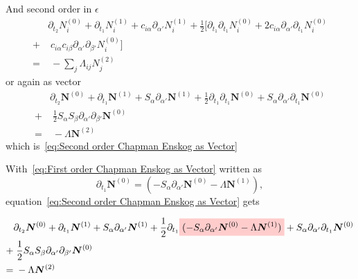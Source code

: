 \documentclass[]{article}
\newcommand{\highlight}[1]{%
  \colorbox{red!20}{$\displaystyle#1$}}
\begin{document}
\begin{appendices}
And second order in $\epsilon$
\begin{equation*}
	\begin{aligned}
		& \partial_{t_2} N_i^{(0)} + \partial_{t_1} N_i^{(1)} + c_{i\alpha}\partial_{\alpha'} N_i^{(1)} + \frac{1}{2} [\partial_{t_1}\partial_{t_1} N_i^{(0)} + 2 c_{i\alpha}\partial_{\alpha'}\partial_{t_1} N_i^{(0)} \\
		+ &\; c_{i\alpha}c_{i\beta}\partial_{\alpha'}\partial_{\beta'} N_i^{(0)}] \\
		= &\; - \sum_j \Lambda_{ij}  N_j^{(2)}
	\end{aligned}
\end{equation*}
or again as vector
\begin{equation*}
	\begin{aligned}
		& \partial_{t_2} \boldsymbol{N}^{(0)} + \partial_{t_1} \boldsymbol{N}^{(1)} + S_\alpha \partial_{\alpha'} \boldsymbol{N}^{(1)} + \frac{1}{2} \partial_{t_1}\partial_{t_1} \boldsymbol{N}^{(0)} +  S_\alpha
		 \partial_{\alpha'}\partial_{t_1} \boldsymbol{N}^{(0)} \\
		+ &\; \frac{1}{2} S_\alpha S_\beta\partial_{\alpha'}\partial_{\beta'} \boldsymbol{N}^{(0)} \\
		= &\; - \Lambda  \boldsymbol{N}^{(2)}
	\end{aligned}
\end{equation*}
which is~\eqref{eq:Second order Chapman Enskog as Vector}


With~\eqref{eq:First order Chapman Enskog as Vector} written as
\begin{equation*}
	\partial_{t_1} \boldsymbol{N}^{(0)} = (- S_{\alpha}\partial_{\alpha'} \boldsymbol{N}^{(0)} -  \Lambda \boldsymbol{N}^{(1)}),
\end{equation*}
equation~\eqref{eq:Second order Chapman Enskog as Vector} gets

\begin{equation*}
	\begin{aligned}
		& \partial_{t_2} \boldsymbol{N}^{(0)} + \partial_{t_1} \boldsymbol{N}^{(1)} + S_\alpha \partial_{\alpha'} \boldsymbol{N}^{(1)} + \frac{1}{2} \partial_{t_1}\highlight{(- S_{\alpha}\partial_{\alpha'} \boldsymbol{N}^{(0)} -  \Lambda \boldsymbol{N}^{(1)})} +  S_\alpha
		 \partial_{\alpha'}\partial_{t_1} \boldsymbol{N}^{(0)} \\
		+ &\; \frac{1}{2} S_\alpha S_\beta\partial_{\alpha'}\partial_{\beta'} \boldsymbol{N}^{(0)} \\
		= &\; - \Lambda  \boldsymbol{N}^{(2)}
	\end{aligned}
\end{equation*}


\end{appendices}
\end{document}
